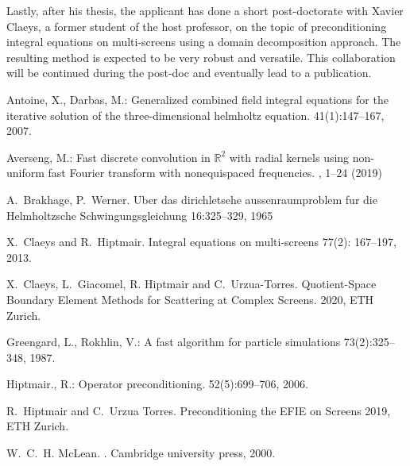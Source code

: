 \documentclass[]{article}
\begin{document}
Lastly, after his thesis, the applicant has done a short post-doctorate with Xavier Claeys, a former student of the host professor, on the topic of preconditioning integral equations on multi-screens using a domain decomposition approach. The resulting method is expected to be very robust and versatile. This collaboration will be continued during the post-doc and eventually lead to a publication. 


\begin{thebibliography}{0}
	
	Antoine, X., Darbas, M.:
	\newblock Generalized combined field integral equations for the iterative
	solution of the three-dimensional helmholtz equation.
	41(1):147--167, 2007.
	
	Averseng, M.:
	\newblock Fast discrete convolution in $\mathbb {R}^{2} $ with radial kernels using non-uniform fast Fourier transform with nonequispaced frequencies. 
	, 1--24 (2019) 
	
	A.~Brakhage, P.~Werner.
	\newblock Uber das dirichletsehe aussenraumproblem fur die Helmholtzsche Schwingungsgleichung
	 16:325–329, 1965
	
	
	X.~Claeys and R.~Hiptmair.
	\newblock Integral equations on multi-screens
	 77(2): 167--197, 2013.
	
	X.~Claeys, L.~Giacomel, R. Hiptmair and C.~Urzua-Torres.
	\newblock Quotient-Space Boundary Element Methods for Scattering at Complex Screens.
	 2020, ETH Zurich.
	
	
	Greengard, L., Rokhlin, V.:
	\newblock A fast algorithm for particle simulations
	 73(2):325--348, 1987.
	
	Hiptmair., R.:
	\newblock Operator preconditioning.
	 52(5):699--706, 2006.
	
	
	R.~Hiptmair and C.~Urzua Torres.
	Preconditioning the EFIE on Screens
	 2019, ETH Zurich.
	
	W.~C.~H. McLean.
	.
	\newblock Cambridge university press, 2000.
	

\end{thebibliography}
\end{document}
